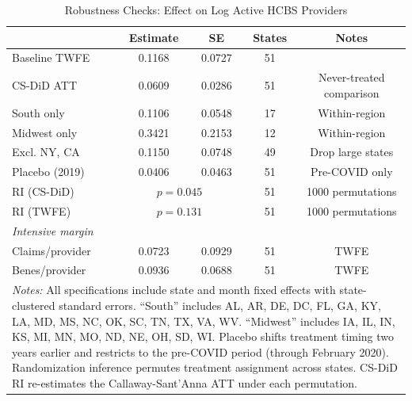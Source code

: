 \begin{table}[htbp]
\centering
\caption{Robustness Checks: Effect on Log Active HCBS Providers}
\label{tab:robustness}
\begin{tabular}{lcccc}
\hline\hline
 & Estimate & SE & States & Notes \\
\hline
Baseline TWFE & 0.1168 & 0.0727 & 51 & \\
CS-DiD ATT & 0.0609 & 0.0286 & 51 & Never-treated comparison \\
South only & 0.1106 & 0.0548 & 17 & Within-region \\
Midwest only & 0.3421 & 0.2153 & 12 & Within-region \\
Excl. NY, CA & 0.1150 & 0.0748 & 49 & Drop large states \\
Placebo (2019) & 0.0406 & 0.0463 & 51 & Pre-COVID only \\
RI (CS-DiD) & \multicolumn{2}{c}{$p = 0.045$} & 51 & 1000 permutations \\
RI (TWFE) & \multicolumn{2}{c}{$p = 0.131$} & 51 & 1000 permutations \\
\hline
\multicolumn{5}{l}{\textit{Intensive margin}} \\
Claims/provider & 0.0723 & 0.0929 & 51 & TWFE \\
Benes/provider & 0.0936 & 0.0688 & 51 & TWFE \\
\hline\hline
\multicolumn{5}{p{13cm}}{\footnotesize \textit{Notes:} All specifications include state and month fixed effects with state-clustered standard errors. ``South'' includes AL, AR, DE, DC, FL, GA, KY, LA, MD, MS, NC, OK, SC, TN, TX, VA, WV. ``Midwest'' includes IA, IL, IN, KS, MI, MN, MO, ND, NE, OH, SD, WI. Placebo shifts treatment timing two years earlier and restricts to the pre-COVID period (through February 2020). Randomization inference permutes treatment assignment across states. CS-DiD RI re-estimates the Callaway-Sant'Anna ATT under each permutation.} \\
\end{tabular}
\end{table}

